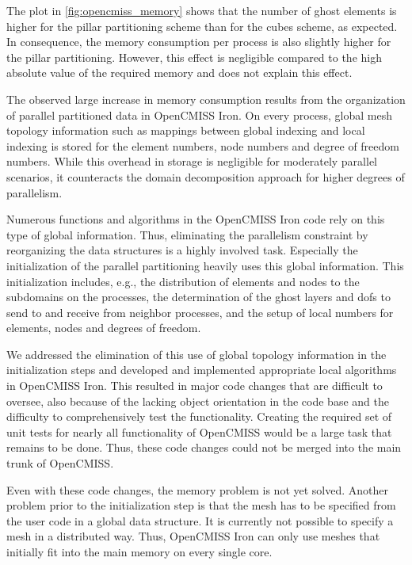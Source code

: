 The plot in \cref{fig:opencmiss_memory} shows that the number of ghost elements is higher for the pillar partitioning scheme than for the cubes scheme, as expected. In consequence, the memory consumption per process is also slightly higher for the pillar partitioning.
However, this effect is negligible compared to the high absolute value of the required memory and does not explain this effect.

The observed large increase in memory consumption results from the organization of parallel partitioned data in OpenCMISS Iron. On every process, global mesh topology information such as mappings between global indexing and local indexing is stored for the element numbers, node numbers and degree of freedom numbers. While this overhead in storage is negligible for moderately parallel scenarios, it counteracts the domain decomposition approach for higher degrees of parallelism. 

Numerous functions and algorithms in the OpenCMISS Iron code rely on this type of global information. Thus, eliminating the parallelism constraint by reorganizing the data structures is a highly involved task. Especially the initialization of the parallel partitioning heavily uses this global information. This initialization includes, e.g., the distribution of elements and nodes to the subdomains on the processes, the determination of the ghost layers and dofs to send to and receive from neighbor processes, and the setup of local numbers for elements, nodes and degrees of freedom.

We addressed the elimination of this use of global topology information in the initialization steps and developed and implemented appropriate local algorithms in OpenCMISS Iron. This resulted in major code changes that are difficult to oversee, also because of the lacking object orientation in the code base and the difficulty to comprehensively test the functionality. Creating the required set of unit tests for nearly all functionality of OpenCMISS would be a large task that remains to be done. Thus, these code changes could not be merged into the main trunk of OpenCMISS.

Even with these code changes, the memory problem is not yet solved. Another problem prior to the initialization step is that the mesh has to be specified from the user code in a global data structure. It is currently not possible to specify a mesh in a distributed way. Thus, OpenCMISS Iron can only use meshes that initially fit into the main memory on every single core.

